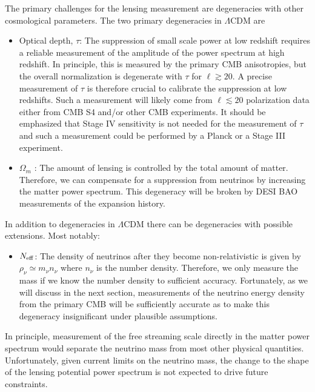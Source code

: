 The primary challenges for the lensing measurement are degeneracies with other cosmological parameters.  The two primary degeneracies in $\Lambda$CDM are
\begin{itemize}
\item Optical depth, $\tau$: The suppression of small scale power at low redshift requires a reliable measurement of the amplitude of the power spectrum at high redshift.  In principle, this is measured by the primary CMB anisotropies, but the overall normalization is degenerate with $\tau$ for $\ell \gtrsim 20$.  A precise measurement of $\tau$ is therefore crucial to calibrate the suppression at low redshifts.  Such a measurement will likely come from $\ell \lesssim 20$ polarization data either from CMB S4 and/or other CMB experiments.  It should be emphasized that Stage IV sensitivity is not needed for the measurement of $\tau$ and such a measurement could be performed by a Planck or a Stage III experiment.


\item $\Omega_m$ : The amount of lensing is controlled by the total amount of matter.  Therefore, we can compensate for a suppression from neutrinos by increasing the matter power spectrum.  This degeneracy will be broken by DESI BAO measurements of the expansion history.
\end{itemize}
In addition to degeneracies in $\Lambda$CDM there can be degeneracies with possible extensions.  Most notably:
\begin{itemize}
\item $N_{\rm eff}$: The density of neutrinos after they become non-relativistic is given by $\rho_\nu \simeq m_\nu n_\nu$ where $n_\nu$ is the number density.  Therefore, we only measure the mass if we know the number density to sufficient accuracy.  Fortunately, as we will discuss in the next section, measurements of the neutrino energy density from the primary CMB will be sufficiently accurate as to make this degeneracy insignificant under plausible assumptions.
\end{itemize}
In principle, measurement of the free streaming scale directly in the matter power spectrum would separate the neutrino mass from most other physical quantities.  Unfortunately, given current limits on the neutrino mass, the change to the shape of the lensing potential power spectrum is not expected to drive future constraints.  

